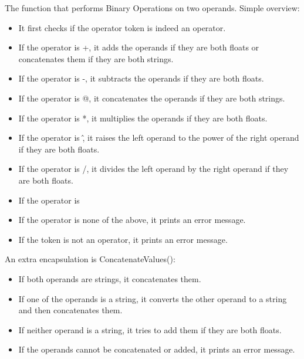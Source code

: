The function that performs Binary Operations on two operands. Simple overview:
\begin{itemize}
    \item It first checks if the operator token is indeed an operator.
    \item If the operator is +, it adds the operands if they are both floats or concatenates them if they are both strings.
    \item If the operator is -, it subtracts the operands if they are both floats.
    \item If the operator is @, it concatenates the operands if they are both strings.
    \item If the operator is *, it multiplies the operands if they are both floats.
    \item If the operator is \^, it raises the left operand to the power of the right operand if they are both floats.
    \item If the operator is /, it divides the left operand by the right operand if they are both floats.
    \item If the operator is %
    \item If the operator is none of the above, it prints an error message.
    \item If the token is not an operator, it prints an error message.
\end{itemize}
An extra encapsulation is ConcatenateValues():
\begin{itemize}
    \item If both operands are strings, it concatenates them.
    \item If one of the operands is a string, it converts the other operand to a string and then concatenates them.
    \item If neither operand is a string, it tries to add them if they are both floats.
    \item If the operands cannot be concatenated or added, it prints an error message.
\end{itemize}